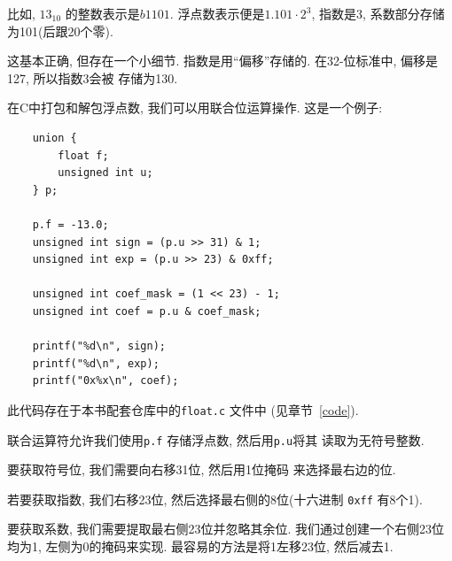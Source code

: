 \documentclass[12pt]{book}
\begin{document}
{%
比如, $13_{10}$ 的整数表示是$b1101$.
浮点数表示便是$1.101 \cdot 2^3$, 指数是3, 
系数部分存储为101(后跟20个零).


这基本正确, 但存在一个小细节.
指数是用``偏移''存储的. 在32-位标准中, 偏移是127, 所以指数3会被
存储为130. 

在C中打包和解包浮点数, 我们可以用联合位运算操作. 
这是一个例子:
%
\begin{verbatim}
    union {
        float f;
        unsigned int u;
    } p;

    p.f = -13.0;
    unsigned int sign = (p.u >> 31) & 1;
    unsigned int exp = (p.u >> 23) & 0xff;

    unsigned int coef_mask = (1 << 23) - 1;
    unsigned int coef = p.u & coef_mask;

    printf("%d\n", sign);
    printf("%d\n", exp);
    printf("0x%x\n", coef);
\end{verbatim}
%
此代码存在于本书配套仓库中的{\tt float.c} 文件中
(见章节~\ref{code}).

联合运算符允许我们使用{\tt p.f} 存储浮点数, 然后用{\tt p.u}将其
读取为无符号整数. 


要获取符号位, 我们需要向右移31位, 然后用1位掩码
来选择最右边的位.

若要获取指数, 我们右移23位, 然后选择最右侧的8位(十六进制
 {\tt 0xff} 有8个1).

要获取系数, 我们需要提取最右侧23位并忽略其余位. 
我们通过创建一个右侧23位均为1, 左侧为0的掩码来实现. 
最容易的方法是将1左移23位, 然后减去1. 

}
\end{document}
